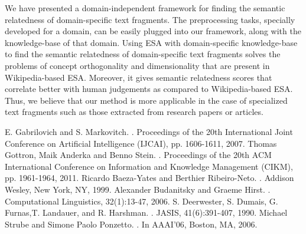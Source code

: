 \documentclass[conference]{IEEEtran}
\begin{document}
We have presented a domain-independent framework for finding the semantic relatedness of domain-specific text fragments. The preprocessing tasks, specially developed for a domain, can be
\newpage
\noindent easily plugged into our framework, along with the knowledge-base of that domain. Using ESA with domain-specific knowledge-base to find the semantic relatedness of domain-specific text fragments solves the problems of concept orthogonality and dimensionality that are present in Wikipedia-based ESA. Moreover, it gives semantic relatedness scores that correlate better with human judgements as compared to Wikipedia-based ESA. Thus, we believe that our method is more applicable in the case of specialized text fragments such as those extracted from research papers or articles.



\begin{thebibliography}{1}
E. Gabrilovich and S. Markovitch.
.
\newblock Proceedings of the 20th International Joint Conference on Artificial Intelligence (IJCAI), pp. 1606-1611, 2007.
Thomas Gottron, Maik Anderka and Benno Stein.
.
\newblock Proceedings of the 20th ACM International Conference on Information and Knowledge Management (CIKM), pp. 1961-1964, 2011.
Ricardo Baeza-Yates and Berthier Ribeiro-Neto.
.
\newblock Addison Wesley, New York, NY, 1999.
Alexander Budanitsky and Graeme Hirst.
.
\newblock Computational Linguistics, 32(1):13-47, 2006.
S. Deerwester, S. Dumais, G. Furnas,T. Landauer, and R. Harshman.
.
\newblock JASIS, 41(6):391-407, 1990.
Michael Strube and Simone Paolo Ponzetto.
.
\newblock In AAAI’06, Boston, MA, 2006.
\end{thebibliography}
\end{document}
